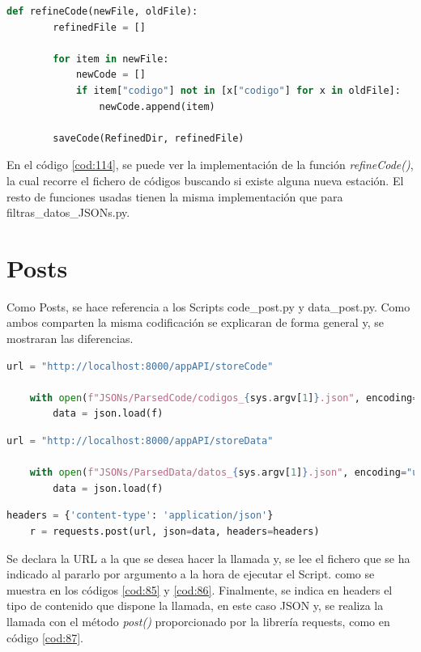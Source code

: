 \begin{lstlisting}[language=Python, caption={Declaración función refinedCode()}, label=cod:114]
	def refineCode(newFile, oldFile):
		refinedFile = []
		
		for item in newFile:
			newCode = []
			if item["codigo"] not in [x["codigo"] for x in oldFile]:
				newCode.append(item)
		
		saveCode(RefinedDir, refinedFile)
\end{lstlisting}

En el código \ref{cod:114}, se puede ver la implementación de la función \textit{refineCode()}, la cual recorre el fichero de códigos buscando si existe alguna nueva estación. El resto de funciones usadas tienen la misma implementación que para filtras\_datos\_JSONs.py.

\section{Posts}
Como Posts, se hace referencia a los Scripts code\_post.py y data\_post.py. Como ambos comparten la misma codificación se explicaran de forma general y, se mostraran las diferencias.

\begin{lstlisting}[language=Python, caption={Declaración variables code\_post.py}, label=cod:85]
	url = "http://localhost:8000/appAPI/storeCode"
	
	with open(f"JSONs/ParsedCode/codigos_{sys.argv[1]}.json", encoding="utf-8") as f:
		data = json.load(f)
\end{lstlisting}

\begin{lstlisting}[language=Python, caption={Declaración variables data\_post.py}, label=cod:86]
	url = "http://localhost:8000/appAPI/storeData"
	
	with open(f"JSONs/ParsedData/datos_{sys.argv[1]}.json", encoding="utf-8") as f:
		data = json.load(f)
\end{lstlisting}

\begin{lstlisting}[language=Python, caption={Llamada POST}, label=cod:87]
	headers = {'content-type': 'application/json'}
	r = requests.post(url, json=data, headers=headers)
\end{lstlisting}

Se declara la URL a la que se desea hacer la llamada y, se lee el fichero que se ha indicado al pararlo por argumento a la hora de ejecutar el Script. como se muestra en los códigos \ref{cod:85} y \ref{cod:86}. Finalmente, se indica en headers el tipo de contenido que dispone la llamada, en este caso JSON y, se realiza la llamada con el método \textit{post()} proporcionado por la librería requests, como en código \ref{cod:87}.

